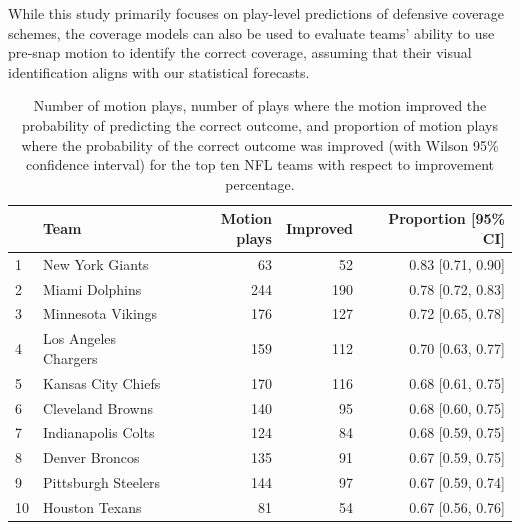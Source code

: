 \documentclass[namedate,webpdf,modern,medium]{oup-authoring-template}
\begin{document}
While this study primarily focuses on play-level predictions of defensive coverage schemes, the coverage models can also be used to evaluate teams’ ability to use pre‑snap motion to identify the correct coverage, assuming that their visual identification aligns with our statistical forecasts.  

\begin{table}[t!]
\centering
\caption{Number of motion plays, number of plays where the motion improved the probability of predicting the correct outcome, and proportion of motion plays where the probability of the correct outcome was improved (with Wilson 95\% confidence interval) for the top ten NFL teams with respect to improvement percentage.}
\label{fig:team_tab}
\begin{tabular}{llrrr}
\hline
 & Team & Motion plays & Improved & Proportion [95\% CI] \\
\hline
1 & New York Giants & 63 & 52 & 0.83 [0.71, 0.90] \\
2 & Miami Dolphins & 244 & 190 & 0.78 [0.72, 0.83] \\
3 & Minnesota Vikings & 176 & 127 & 0.72 [0.65, 0.78] \\
4 & Los Angeles Chargers & 159 & 112 & 0.70 [0.63, 0.77] \\
5 & Kansas City Chiefs & 170 & 116 & 0.68 [0.61, 0.75] \\
6 & Cleveland Browns & 140 & 95 & 0.68 [0.60, 0.75] \\
7 & Indianapolis Colts & 124 & 84 & 0.68 [0.59, 0.75] \\
8 & Denver Broncos & 135 & 91 & 0.67 [0.59, 0.75] \\
9 & Pittsburgh Steelers & 144 & 97 & 0.67 [0.59, 0.74] \\
10 & Houston Texans & 81 & 54 & 0.67 [0.56, 0.76] \\
\hline
\end{tabular}
\end{table}
\end{document}

